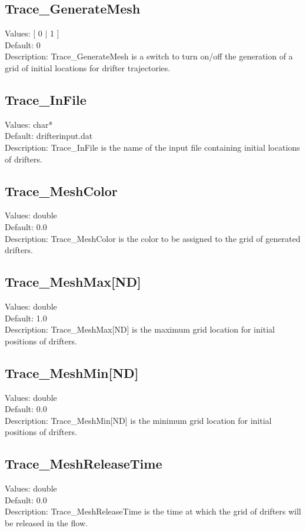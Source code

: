 \documentclass[11pt]{article}
\begin{document}
\subsection{Trace\_GenerateMesh}
Values:   [ 0 $|$ 1 ] \\
Default:  0\\
Description:  Trace\_GenerateMesh is a switch to turn on/off the generation of a grid of initial locations for drifter trajectories.

\subsection{Trace\_InFile}
Values:   char* \\
Default:  drifterinput.dat\\
Description:  Trace\_InFile is the name of the input file containing initial locations of drifters.

\subsection{Trace\_MeshColor	}
Values:   double \\
Default:  0.0\\
Description:   Trace\_MeshColor is the color to be assigned to the grid of generated drifters.

\subsection{Trace\_MeshMax[ND]}
Values:   double \\
Default:  1.0\\
Description: Trace\_MeshMax[ND] is the maximum grid location for initial positions of drifters.

\subsection{Trace\_MeshMin[ND]}
Values:   double \\
Default:  0.0\\
Description:  Trace\_MeshMin[ND] is the minimum grid location for initial positions of drifters.

\subsection{Trace\_MeshReleaseTime}
Values:   double \\
Default:  0.0\\
Description:   Trace\_MeshReleaseTime is the time at which the grid of drifters will be released in the flow.
\end{document}
